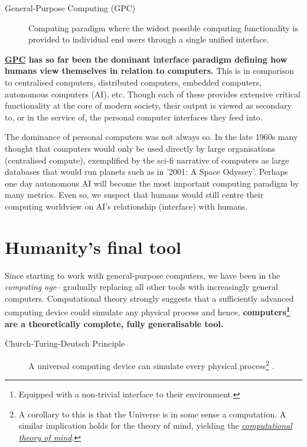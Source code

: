 \documentclass[logo,bsc,singlespacing,parskip]{infthesis}
\begin{document}
\begin{mdframed}
\begin{description}
\item[{\label{orgbaec896}General-Purpose Computing (\label{org6ef4753}GPC)}] Computing paradigm where the widest possible computing functionality is provided to individual end users through a single unified interface.
\end{description}
\end{mdframed}

\textbf{\hyperref[org6ef4753]{GPC} has so far been the dominant interface paradigm defining how humans view themselves in relation to computers.}
This is in comparison to centralised computers, distributed computers, embedded computers, autonomous computers (AI), etc.
Though each of these provides extensive critical functionality at the core of modern society, their output is viewed as secondary to, or in the service of, the personal computer interfaces they feed into.

The dominance of personal computers was not always so.
In the late 1960s many thought that computers would only be used directly by large organisations (centralised compute), exemplified by the sci-fi narrative of computers as large databases that would run planets such as in '2001: A Space Odyssey'.
Perhaps one day autonomous AI will become the most important computing paradigm by many metrics.
Even so, we suspect that humans would still centre their computing worldview on AI's relationship (interface) with humans.

\section{Humanity's final tool}
\label{sec:org1c75149}
Since starting to work with general-purpose computers, we have been in the \emph{computing age}-- gradually replacing all other tools with increasingly general computers.
Computational theory strongly suggests that a sufficiently advanced computing device could simulate any physical process and hence, \textbf{computers\footnote{Equipped with a non-trivial interface to their environment.} are a theoretically complete, fully generalisable tool.}

\begin{mdframed}
\begin{description}
\item[{\label{org78bb90f}Church-Turing-Deutsch Principle}] A universal computing device can simulate every physical process\footnote{A corollary to this is that the Universe is in some sense a computation. A similar implication holds for the theory of mind, yielding the \emph{\hyperref[computational theory of mind]{computational theory of mind}}.} \autocite{deutschQuantumTheoryChurchTuring1985}.
\end{description}
\end{mdframed}
\end{document}

